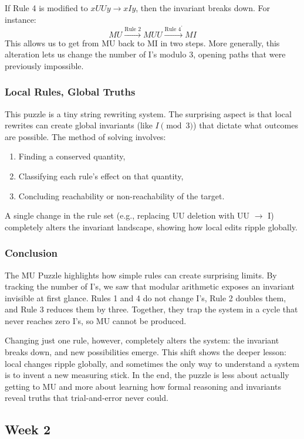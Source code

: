 \documentclass{article}
\theoremstyle{theorem}
\theoremstyle{definition}
\theoremstyle{remark}
\begin{document}
If Rule 4 is modified to $xUUy \to xIy$, then the invariant breaks down. For instance:
\[
MU \xrightarrow{\text{Rule 2}} MUU \xrightarrow{\text{Rule 4$^\prime$}} MI
\]
This allows us to get from MU back to MI in two steps. More generally, this alteration lets us change the number of I’s modulo 3, opening paths that were previously impossible.

\subsubsection{Local Rules, Global Truths}

This puzzle is a tiny string rewriting system. The surprising aspect is that local rewrites can create global invariants (like $I \pmod{3}$) that dictate what outcomes are possible. The method of solving involves:
\begin{enumerate}
  \item Finding a conserved quantity,
  \item Classifying each rule’s effect on that quantity,
  \item Concluding reachability or non-reachability of the target.
\end{enumerate}
A single change in the rule set (e.g., replacing UU deletion with UU $\to$ I) completely alters the invariant landscape, showing how local edits ripple globally.

\subsubsection{Conclusion}

The MU Puzzle highlights how simple rules can create surprising limits. By tracking the number of I’s, we saw that modular arithmetic exposes an invariant invisible at first glance. Rules 1 and 4 do not change I’s, Rule 2 doubles them, and Rule 3 reduces them by three. Together, they trap the system in a cycle that never reaches zero I’s, so MU cannot be produced.  

Changing just one rule, however, completely alters the system: the invariant breaks down, and new possibilities emerge. This shift shows the deeper lesson: local changes ripple globally, and sometimes the only way to understand a system is to invent a new measuring stick. In the end, the puzzle is less about actually getting to MU and more about learning how formal reasoning and invariants reveal truths that trial-and-error never could.

\subsection{Week 2}
\end{document}
